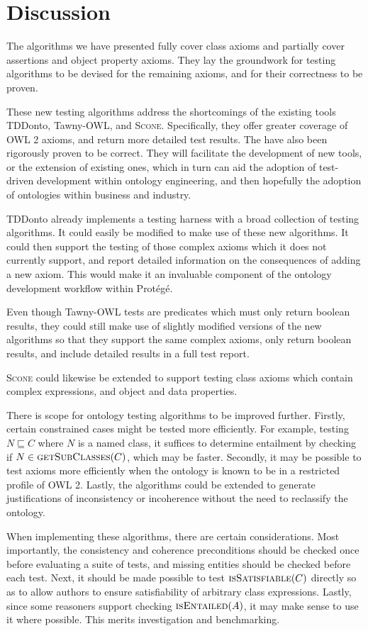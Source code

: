 \documentclass[paper.tex]{subfiles}
\begin{document}
\section{Discussion}
\label{sec:discussion}

The algorithms we have presented fully cover class axioms and partially cover assertions and object property axioms.
They lay the groundwork for testing algorithms to be devised for the remaining axioms, and for their correctness to be proven.

These new testing algorithms address the shortcomings of the existing tools TDDonto, Tawny-OWL, and \textsc{Scone}.
Specifically, they offer greater coverage of OWL 2 axioms, and return more detailed test results.
The have also been rigorously proven to be correct.
They will facilitate the development of new tools, or the extension of existing ones, which in turn can aid the adoption of test-driven development within ontology engineering, and then hopefully the adoption of ontologies within business and industry.

TDDonto already implements a testing harness with a broad collection of testing algorithms.
It could easily be modified to make use of these new algorithms.
It could then support the testing of those complex axioms which it does not currently support, and report detailed information on the consequences of adding a new axiom.
This would make it an invaluable component of the ontology development workflow within Prot\'eg\'e.

Even though Tawny-OWL tests are predicates which must only return boolean results, they could still make use of slightly modified versions of the new algorithms so that they support the same complex axioms, only return boolean results, and include detailed results in a full test report.

\textsc{Scone} could likewise be extended to support testing class axioms which contain complex expressions, and object and data properties.

There is scope for ontology testing algorithms to be improved further.
Firstly, certain constrained cases might be tested more efficiently.
For example, testing $N \sqsubseteq C$ where $N$ is a named class, it suffices to determine entailment by checking if $N \in \Call{getSubClasses}{C}$, which may be faster.
Secondly, it may be possible to test axioms more efficiently when the ontology is known to be in a restricted profile of OWL 2.
Lastly, the algorithms could be extended to generate justifications of inconsistency or incoherence without the need to reclassify the ontology.

When implementing these algorithms, there are certain considerations.
Most importantly, the consistency and coherence preconditions should be checked once before evaluating a suite of tests, and missing entities should be checked before each test.
Next, it should be made possible to test $\Call{isSatisfiable}{C}$ directly so as to allow authors to ensure satisfiability of arbitrary class expressions.
Lastly, since some reasoners support checking $\Call{isEntailed}{A}$, it may make sense to use it where possible.  This merits investigation and benchmarking.
\end{document}
